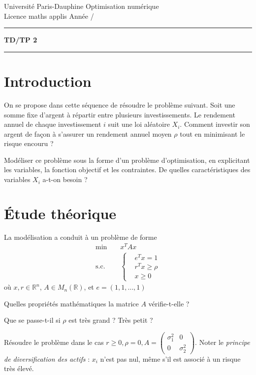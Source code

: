 \documentclass[12pt,a4paper,fleqn]{report}
\makeatletter
\def\cleardoublepage{\clearpage\if@twoside\ifodd\c@page\else\hbox{}\thispagestyle{empty}\newpage\fi\fi}
\newcommand{\R}{\mathbb R}
\makeatother
\begin{document}
\cleardoublepage

\noindent
Universit\'e Paris-Dauphine     \hfill      Optimisation num\'erique\\
Licence maths applis      \hfill      Ann\'ee /

\medskip

\hrule

\medskip



\begin{center}

\textbf{\huge TD/TP 2}

\smallskip

\rule{10cm}{0.4pt}

\end{center}

\section{Introduction}
On se propose dans cette séquence de résoudre le problème
suivant. Soit une somme fixe d'argent à répartir entre plusieurs
investissements. Le rendement annuel de chaque investissement $i$ suit
une loi aléatoire $X_{i}$. Comment investir son argent de façon à
s'assurer un rendement annuel moyen $\rho$ tout en minimisant le
risque encouru ?

Modéliser ce problème sous la forme d'un problème d'optimisation, en
explicitant les variables, la fonction objectif et les contraintes. De
quelles caractéristiques des variables $X_{i}$ a-t-on besoin ?

\section{Étude théorique}
La modélisation a conduit à un problème de forme
\begin{align*}
  \text{min} \;\;\;\;&x^{T} A x\\
  \text{s.c.}\;\;\;\;&\begin{cases}
    &e^{T} x = 1\\
  &r^{T} x \geq \rho\\
  &x \geq 0
  \end{cases}
\end{align*}
où $x, r \in \R^{n}$, $A \in M_{n}(\R)$, et $e = (1,1,\dots,1)$

\begin{exercice}
\begin{questions}
\item Quelles propriétés mathématiques la matrice $A$ vérifie-t-elle ?
\item Que se passe-t-il si $\rho$ est très grand ? Très petit ?
\item Résoudre le problème dans le cas $r \geq 0, \rho = 0, A =
  \begin{pmatrix}
    \sigma_{1}^{2}&0\\0&\sigma_{2}^{2}
  \end{pmatrix}$. Noter le \textit{principe de diversification des
    actifs} : $x_{i}$ n'est pas nul, même s'il est associé à un risque
  très élevé.
\end{questions}
\end{exercice}
\end{document}
